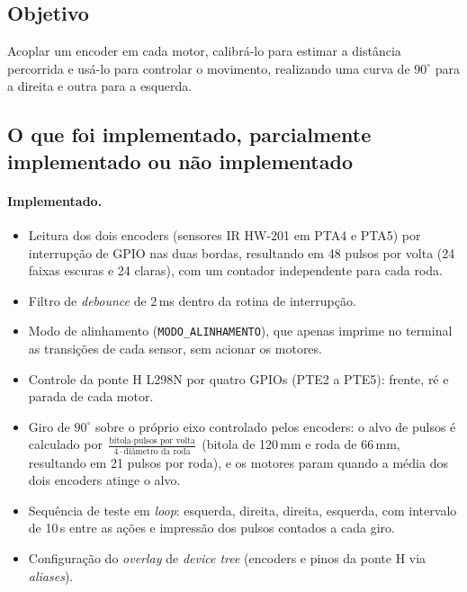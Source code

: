 \subsection*{Objetivo}
Acoplar um encoder em cada motor, calibrá-lo para estimar a distância percorrida
e usá-lo para controlar o movimento, realizando uma curva de $90^\circ$ para a direita
e outra para a esquerda.

\subsection{O que foi implementado, parcialmente implementado ou não implementado}

\paragraph{Implementado.}
\begin{itemize}[noitemsep]
    \item Leitura dos dois encoders (sensores IR HW-201 em PTA4 e PTA5) por interrupção de GPIO
          nas duas bordas, resultando em 48 pulsos por volta (24 faixas escuras e 24 claras),
          com um contador independente para cada roda.
    \item Filtro de \textit{debounce} de 2\,ms dentro da rotina de interrupção.
    \item Modo de alinhamento (\texttt{MODO\_ALINHAMENTO}), que apenas imprime no terminal as
          transições de cada sensor, sem acionar os motores.
    \item Controle da ponte H L298N por quatro GPIOs (PTE2 a PTE5): frente, ré e parada de cada motor.
    \item Giro de $90^\circ$ sobre o próprio eixo controlado pelos encoders: o alvo de pulsos é
          calculado por $\frac{\text{bitola} \cdot \text{pulsos por volta}}{4 \cdot \text{diâmetro da roda}}$
          (bitola de 120\,mm e roda de 66\,mm, resultando em 21 pulsos por roda), e os motores param quando
          a média dos dois encoders atinge o alvo.
    \item Sequência de teste em \textit{loop}: esquerda, direita, direita, esquerda, com intervalo de 10\,s
          entre as ações e impressão dos pulsos contados a cada giro.
    \item Configuração do \textit{overlay} de \textit{device tree} (encoders e pinos da ponte H via \textit{aliases}).
\end{itemize}

